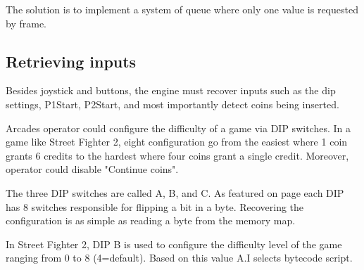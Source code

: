 The solution is to implement a system of queue where only one value is requested by frame.

\pagebreak

 


\subsection{Retrieving inputs}
Besides joystick and buttons, the engine must recover inputs such as the dip settings, P1Start, P2Start, and most importantly detect coins being inserted.

\begin{trivia}
Arcades operator could configure the difficulty of a game via DIP switches. In a game like Street Fighter 2, eight configuration go from the easiest where 1 coin grants 6 credits to the hardest where four coins grant a single credit. Moreover, operator could disable "Continue coins"\cite{sf2manual}.
\end{trivia}

The three DIP switches are called A, B, and C. As featured on page \pageref{fig:boarda} each DIP has 8 switches responsible for flipping a bit in a byte. Recovering the configuration is as simple as reading a byte from the memory map.

\begin{trivia}
In Street Fighter 2, DIP B is used to configure the difficulty level of the game ranging from 0 to 8 (4=default). Based on this value A.I selects bytecode\cite{sf2aiengine} script.
\end{trivia}



